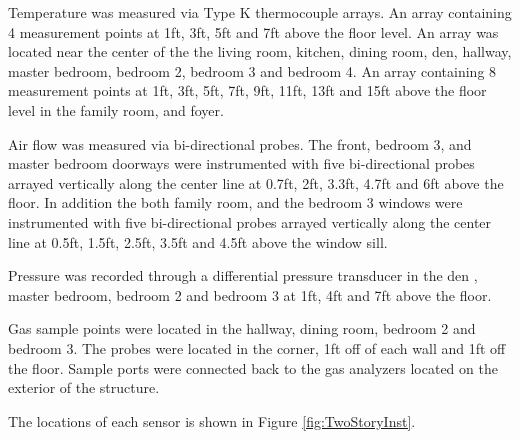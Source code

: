 \documentclass{article}
\begin{document}
Temperature was measured via Type K thermocouple arrays. An array containing 4 measurement points at 1ft, 3ft, 5ft and 7ft above the floor level. An array was located near the center of the the living room, kitchen, dining room, den, hallway, master bedroom, bedroom 2, bedroom 3 and bedroom 4. An array containing 8 measurement points at 1ft, 3ft, 5ft, 7ft, 9ft, 11ft, 13ft and 15ft above the floor level in the family room, and foyer.

Air flow was measured via bi-directional probes. The front, bedroom 3, and master bedroom doorways were instrumented with five bi-directional probes arrayed vertically along the center line at 0.7ft, 2ft, 3.3ft, 4.7ft and 6ft above the floor. In addition the both family room, and the bedroom 3 windows were instrumented with five bi-directional probes arrayed vertically along the center line at 0.5ft, 1.5ft, 2.5ft, 3.5ft and 4.5ft above the window sill. 

Pressure was recorded through a differential pressure transducer in the den , master bedroom, bedroom 2 and bedroom 3 at 1ft, 4ft and 7ft above the floor. 

Gas sample points were located in the hallway, dining room, bedroom 2 and bedroom 3. The probes were located in the corner, 1ft off of each wall and 1ft off the floor. Sample ports were connected back to the gas analyzers located on the exterior of the structure. 

The locations of each sensor is shown in Figure \ref{fig:TwoStoryInst}.
\end{document}

